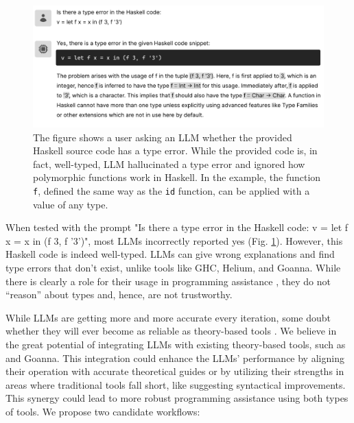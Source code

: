 \begin{figure}[hbt]
  \includegraphics[width=\linewidth]{LLM2}
  \caption[An example where LLM identified a type error in well-typed source code]{\label{fig:llm2}
  The figure shows a user asking an LLM whether the provided Haskell source code has a type error. While the provided code is, in fact, well-typed, LLM hallucinated a type error and ignored how polymorphic functions work in Haskell. In the example, the function \texttt{f},  defined the same way as the \texttt{id} function, can be applied with a value of any type.
    } 
\end{figure}

When tested with the prompt "Is there a type error in the Haskell code: v = let f x = x in (f 3, f '3')", most LLMs incorrectly reported yes (Fig. \ref{fig:llm2}). However, this Haskell code is indeed well-typed. LLMs can give wrong explanations and find type errors that don't exist, unlike tools like GHC, Helium, and Goanna. While there is clearly a role for their usage in programming assistance \cite{Lee2024-hs}, they do not “reason” about types and, hence, are not trustworthy.

While LLMs are getting more and more accurate every iteration, some doubt whether they will ever become as reliable as theory-based tools \cite{Berglund2023-ig}. We believe in the great potential of integrating LLMs with existing theory-based tools, such as \chameleon{} and Goanna. This integration could enhance the LLMs' performance by aligning their operation with accurate theoretical guides or by utilizing their strengths in areas where traditional tools fall short, like suggesting syntactical improvements. This synergy could lead to more robust programming assistance using both types of tools. We propose two candidate workflows:


